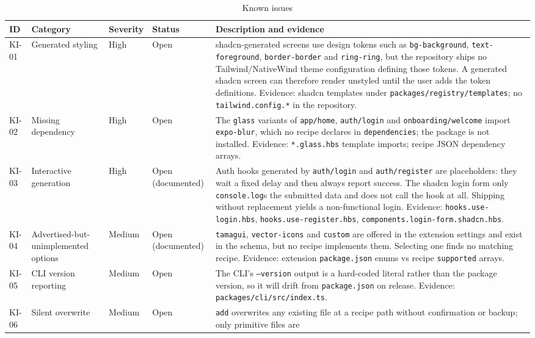 \begin{longtable}{p{1.2cm}p{3.3cm}p{1.6cm}p{1.1cm}p{6.4cm}}
\caption{Known issues}\\
\toprule
\textbf{ID} & \textbf{Category} & \textbf{Severity} & \textbf{Status} &
\textbf{Description and evidence} \\
\midrule

KI-01 & Generated styling & High & Open & shadcn-generated screens use design tokens
such as \texttt{bg-background}, \texttt{text-foreground},
\texttt{border-border} and \texttt{ring-ring}, but the repository ships no
Tailwind/NativeWind theme configuration defining those tokens. A generated shadcn
screen can therefore render unstyled until the user adds the token definitions.
Evidence: shadcn templates under \texttt{packages/registry/templates}; no
\texttt{tailwind.config.*} in the repository. \\
KI-02 & Missing dependency & High & Open & The \texttt{glass} variants of
\texttt{app/home}, \texttt{auth/login} and \texttt{onboarding/welcome} import
\texttt{expo-blur}, which no recipe declares in \texttt{dependencies}; the package
is not installed. Evidence: \texttt{*.glass.hbs} template imports; recipe JSON
dependency arrays. \\
KI-03 & Interactive generation & High & Open (documented) & Auth hooks generated by
\texttt{auth/login} and \texttt{auth/register} are placeholders: they wait a fixed
delay and then always report success. The shadcn login form only
\texttt{console.log}s the submitted data and does not call the hook at all.
Shipping without replacement yields a non-functional login. Evidence:
\texttt{hooks.use-login.hbs}, \texttt{hooks.use-register.hbs},
\texttt{components.login-form.shadcn.hbs}. \\
KI-04 & Advertised-but-unimplemented options & Medium & Open (documented) &
\texttt{tamagui}, \texttt{vector-icons} and \texttt{custom} are offered in the
extension settings and exist in the schema, but no recipe implements them.
Selecting one finds no matching recipe. Evidence: extension
\texttt{package.json} enums vs recipe \texttt{supported} arrays. \\
KI-05 & CLI version reporting & Medium & Open & The CLI's \texttt{--version} output
is a hard-coded literal rather than the package version, so it will drift from
\texttt{package.json} on release. Evidence:
\texttt{packages/cli/src/index.ts}. \\
KI-06 & Silent overwrite & Medium & Open & \texttt{add} overwrites any existing file
at a recipe path without confirmation or backup; only primitive files are

\end{longtable}
